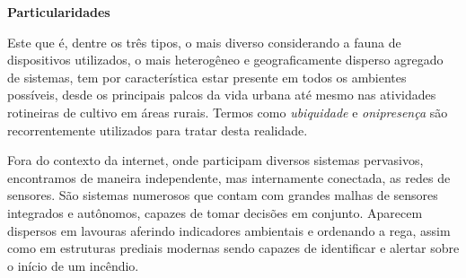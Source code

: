 \documentclass[brazil]{homework}
\begin{document}
\textbf{Particularidades}

Este que é, dentre os três tipos, o mais diverso considerando a fauna de dispositivos utilizados, o mais heterogêneo e geograficamente disperso agregado de sistemas, tem por característica estar presente em todos os ambientes possíveis, desde os principais palcos da vida urbana até mesmo nas atividades rotineiras de cultivo em áreas rurais. Termos como \textit{ubiquidade} e \textit{onipresença} são recorrentemente utilizados para tratar desta realidade.

Fora do contexto da internet, onde participam diversos sistemas pervasivos, encontramos de maneira independente, mas internamente conectada, as redes de sensores. São sistemas numerosos que contam com grandes malhas de sensores integrados e autônomos, capazes de tomar decisões em conjunto. Aparecem dispersos em lavouras aferindo indicadores ambientais e ordenando a rega, assim como em estruturas prediais modernas sendo capazes de identificar e alertar sobre o início de um incêndio.
\end{document}
